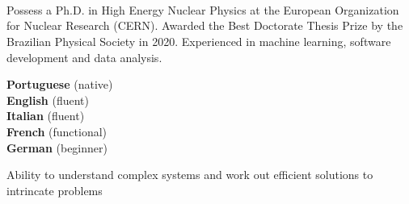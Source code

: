 \documentclass[9pt]{developercv} %
\begin{document}
\begin{minipage}[t]{0.27\textwidth} %
	\vspace{-\baselineskip} %
	
	\\	
    \\
    \\    
    
\end{minipage}


\begin{minipage}[t]{0.46\textwidth}
	\vspace{-6pt}

	Possess a Ph.D. in High Energy Nuclear Physics at the European Organization for Nuclear Research (CERN). Awarded the Best Doctorate Thesis Prize by the Brazilian Physical Society in 2020. Experienced in machine learning, software development and data analysis.
\end{minipage}
\hfill %
\begin{minipage}[t]{0.465\textwidth}
    \vspace{-6pt}

	\begin{minipage}[t]{0.35\textwidth}
		\textbf{Portuguese} (native)\vspace{0.5mm}\\
		\textbf{English} (fluent)\vspace{0.5mm}\\
		\textbf{Italian} (fluent)\vspace{0.5mm}\\
		\textbf{French} (functional)\vspace{0.5mm}\\
		\textbf{German} (beginner)
    \end{minipage}
    \hfill
    \begin{minipage}[t]{0.55\textwidth}
	Ability to understand complex systems and work out efficient solutions to intrincate problems
    \end{minipage}
    
\end{minipage}
\end{document}

